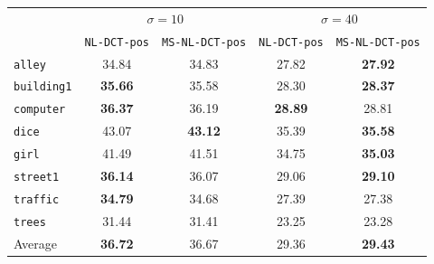 \documentclass{ipol}
\begin{document}
\begin{center}
\begin{tabular}{l | c c | c c }
								 &\multicolumn{2}{c|}{$\sigma = 10$}&\multicolumn{2}{c}{$\sigma = 40$} \\
                         & {\tt NL-DCT-pos}&{\tt MS-NL-DCT-pos} &{\tt NL-DCT-pos} &{\tt MS-NL-DCT-pos} \\\hline
		\texttt{alley    } & {    34.84} & {    34.83}    & {    27.82} & {\bf 27.92}    \\
		\texttt{building1} & {\bf 35.66} & {    35.58}    & {    28.30} & {\bf 28.37}    \\
		\texttt{computer } & {\bf 36.37} & {    36.19}    & {\bf 28.89} & {    28.81}    \\
		\texttt{dice     } & {    43.07} & {\bf 43.12}    & {    35.39} & {\bf 35.58}    \\
		\texttt{girl     } & {    41.49} & {    41.51}    & {    34.75} & {\bf 35.03}    \\
		\texttt{street1  } & {\bf 36.14} & {    36.07}    & {    29.06} & {\bf 29.10}    \\
		\texttt{traffic  } & {\bf 34.79} & {    34.68}    & {    27.39} & {    27.38}    \\
		\texttt{trees    } & {    31.44} & {    31.41}    & {    23.25} & {    23.28}    \\\hline
		Average            & {\bf 36.72} & {    36.67}    & {    29.36} & {\bf 29.43}    \\
\end{tabular}
\end{center}





\end{document}
